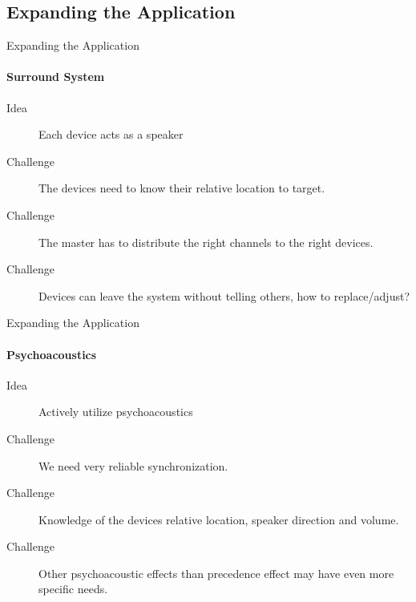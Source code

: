\subsection{Expanding the Application}
\begin{frame}{Expanding the Application}
    \framesubtitle{Surround System}
    \begin{description}
        \item [Idea] Each device acts as a speaker
        \item [Challenge] The devices need to know their relative location to target.
        \item [Challenge] The master has to distribute the right channels to the right devices.
        \item [Challenge] Devices can leave the system without telling others, how to replace/adjust?
    \end{description}
\end{frame}

\begin{frame}{Expanding the Application}
    \framesubtitle{Psychoacoustics}
    \begin{description}
        \item [Idea] Actively utilize psychoacoustics %
        \item [Challenge] We need very reliable synchronization.
        \item [Challenge] Knowledge of the devices relative location, speaker direction and volume.
        \item [Challenge] Other psychoacoustic effects than precedence effect may have even more specific needs.
    \end{description}
\end{frame}

